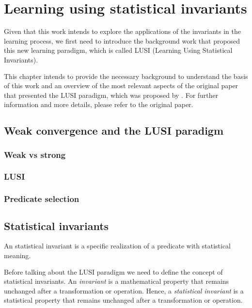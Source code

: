 
\chapter{Learning using statistical invariants} %
\label{Chapter2}

Given that this work intends to explore the applications of the invariants in the learning
process, we first need to introduce the background work that proposed this new learning
paradigm, which is called LUSI (Learning Using Statistical Invariants).

This chapter intends to provide the necessary background to understand the basis of this work
and an overview of the most relevant aspects of the original paper that presented the LUSI paradigm,
which was proposed by \cite{Vapnik2019}. For further information and more details, please
refer to the original paper.

\section{Weak convergence and the LUSI paradigm}
\subsection{Weak vs strong}
\subsection{LUSI}
\subsection{Predicate selection}


\section{Statistical invariants}

An statistical invariant is a specific realization of a predicate with statistical meaning.



Before talking about the LUSI paradigm we need to define the concept of statistical invariants.
An \emph{invariant} is a mathematical property that remains unchanged after a transformation
or operation. Hence, a \emph{statistical invariant} is a statistical property that remains
unchanged after a transformation or operation.

